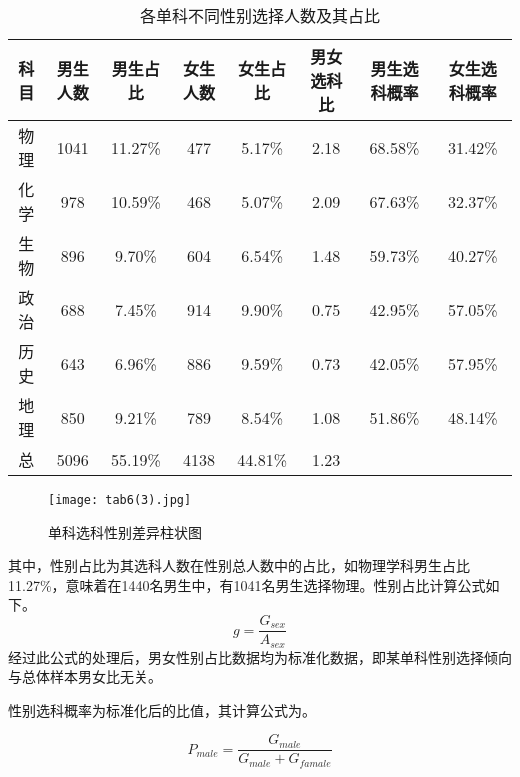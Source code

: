 \documentclass[bwprint]{cumcmthesis}
\begin{document}
	\begin{longtable}{cccccccc}
		\caption{\label{tab:sex_influence}各单科不同性别选择人数及其占比}\\
		\toprule
		科目    & \multicolumn{1}{c}{男生人数} & \multicolumn{1}{c}{男生占比} & \multicolumn{1}{c}{女生人数} & \multicolumn{1}{c}{女生占比} & 男女选科比 & \multicolumn{1}{c}{男生选科概率} & \multicolumn{1}{c}{女生选科概率} \\
		\midrule
		物理    & 1041  & 11.27\% & 477   & 5.17\% & 2.18  & \multicolumn{1}{c}{68.58\%} & \multicolumn{1}{c}{31.42\%} \\
		化学    & 978   & 10.59\% & 468   & 5.07\% & 2.09  & \multicolumn{1}{c}{67.63\%} & \multicolumn{1}{c}{32.37\%} \\
		生物    & 896   & 9.70\% & 604   & 6.54\% & 1.48  & \multicolumn{1}{c}{59.73\%} & \multicolumn{1}{c}{40.27\%} \\
		政治    & 688   & 7.45\% & 914   & 9.90\% & 0.75  & \multicolumn{1}{c}{42.95\%} & \multicolumn{1}{c}{57.05\%} \\
		历史    & 643   & 6.96\% & 886   & 9.59\% & 0.73  & \multicolumn{1}{c}{42.05\%} & \multicolumn{1}{c}{57.95\%} \\
		地理    & 850   & 9.21\% & 789   & 8.54\% & 1.08  & \multicolumn{1}{c}{51.86\%} & \multicolumn{1}{c}{48.14\%} \\
		\midrule
		总     & 5096  & 55.19\% & 4138  & 44.81\% & 1.23  &       &  \\
		\bottomrule
	\end{longtable}%
	\label{}%
	
\begin{figure}[!ht]
	\centering
	\texttt{[image: tab6(3).jpg]}
	\caption{单科选科性别差异柱状图}
\end{figure}
	

其中，性别占比为其选科人数在性别总人数中的占比，如物理学科男生占比11.27\%，意味着在1440名男生中，有1041名男生选择物理。性别占比计算公式如下。
\begin{equation}
g = \frac{G_{sex}}{A_{sex}}
\end{equation}
经过此公式的处理后，男女性别占比数据均为标准化数据，即某单科性别选择倾向与总体样本男女比无关。

性别选科概率为标准化后的比值，其计算公式为。

\begin{equation}
P_{male} = \frac{G_{male}}{G_{male}+G_{famale}}
\end{equation}
\end{document}
